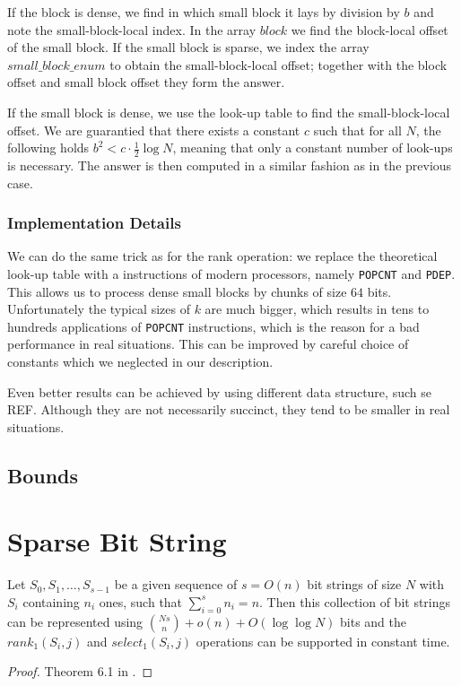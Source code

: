 If the block is dense, we find in which small block it lays by division by $b$ and note the small-block-local index.
In the array $block$ we find the block-local offset of the small block.
If the small block is sparse, we index the array $small\_block\_enum$ to obtain the small-block-local offset; together with the block offset and small block offset they form the answer.

If the small block is dense, we use the look-up table to find the small-block-local offset.
We are guarantied that there exists a constant $c$ such that for all $N$, the following holds $b^2 < c \cdot \frac{1}{2} \log N$, meaning that only a constant number of look-ups is necessary.
The answer is then computed in a similar fashion as in the previous case.

\subsubsection{Implementation Details}

We can do the same trick as for the rank operation: we replace the theoretical look-up table with a instructions of modern processors, namely \verb|POPCNT| and \verb|PDEP|.
This allows us to process dense small blocks by chunks of size $64$ bits.
Unfortunately the typical sizes of $k$ are much bigger, which results in tens to hundreds applications of \verb|POPCNT| instructions, which is the reason for a bad performance in real situations.
This can be improved by careful choice of constants which we neglected in our description.

Even better results can be achieved by using different data structure, such se REF.
Although they are not necessarily succinct, they tend to be smaller in real situations.

\subsection{Bounds}

\section{Sparse Bit String}


\begin{lemma}
	Let $S_0, S_1, \ldots, S_{s-1}$ be a given sequence of $s = O(n)$ bit strings of size $N$ with $S_i$ containing $n_i$ ones, such that $\sum_{i=0}^s n_i = n$.
	Then this collection of bit strings can be represented using ${Ns \choose n} + o(n) + O(\log \log N)$ bits and the $rank_1(S_i, j)$ and $select_1(S_i, j)$ operations can be supported in constant time.
\end{lemma}
\begin{proof}
	Theorem 6.1 in .
\end{proof}

